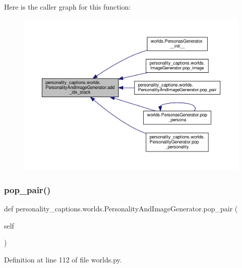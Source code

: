 Here is the caller graph for this function\+:
\nopagebreak
\begin{figure}[H]
\begin{center}
\leavevmode
\includegraphics[width=350pt]{classpersonality__captions_1_1worlds_1_1PersonalityAndImageGenerator_ac246d3fe0a05e842220e73ff837eb2ee_icgraph}
\end{center}
\end{figure}
\mbox{\label{classpersonality__captions_1_1worlds_1_1PersonalityAndImageGenerator_ade0cb023a2efc492a3eedea9c670ef51}} 
\subsubsection{\texorpdfstring{pop\+\_\+pair()}{pop\_pair()}}
{\footnotesize\ttfamily def personality\+\_\+captions.\+worlds.\+Personality\+And\+Image\+Generator.\+pop\+\_\+pair (\begin{DoxyParamCaption}\item[{}]{self }\end{DoxyParamCaption})}



Definition at line 112 of file worlds.\+py.



